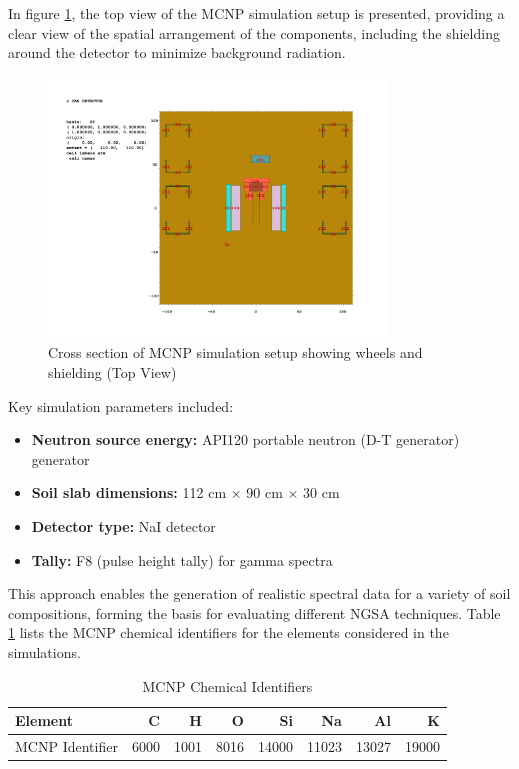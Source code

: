 In figure \ref{fig:mcnp_geometry_top}, the top view of the MCNP simulation setup is presented, providing a clear view of the spatial arrangement of the components, including the shielding around the detector to minimize background radiation.


\begin{figure}[H]
\centering
\includegraphics[width=0.8\textwidth]{../Figures/DataGeneration/top.png}
\caption{Cross section of MCNP simulation setup showing wheels and shielding (Top View)}
\label{fig:mcnp_geometry_top}
\end{figure}

Key simulation parameters included:
\begin{itemize}
\item \textbf{Neutron source energy:} API120 portable neutron (D-T generator) generator \cite{kavetskiy_energy_2018}
\item \textbf{Soil slab dimensions:} 112 cm × 90 cm × 30 cm
\item \textbf{Detector type:} NaI detector \cite{yakubova_measuring_2025}
\item \textbf{Tally:} F8 (pulse height tally) for gamma spectra
\end{itemize}

This approach enables the generation of realistic spectral data for a variety of soil compositions, forming the basis for evaluating different NGSA techniques. Table \ref{tab:chemical_identifiers} lists the MCNP chemical identifiers for the elements considered in the simulations.

\begin{table}[H]
    \centering
    \caption{MCNP Chemical Identifiers}
    \label{tab:chemical_identifiers}
    \begin{tabular}{lrrrrrrr}
    \hline
    Element         &    C &    H &    O &    Si &    Na &    Al &     K \\
    \hline
    MCNP Identifier & 6000 & 1001 & 8016 & 14000 & 11023 & 13027 & 19000 \\
    \hline
    \end{tabular}
\end{table}